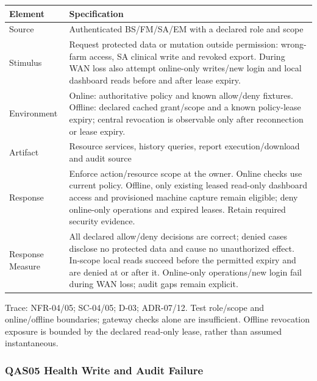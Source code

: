 {\small
\begin{longtable}[]{|>{\raggedright\arraybackslash}p{}|>{\raggedright\arraybackslash}p{}|}
\hline
\textbf{Element} & \textbf{Specification} \\ \hline
\endhead
Source & Authenticated BS/FM/SA/EM with a declared role and scope \\ \hline
Stimulus & Request protected data or mutation outside permission:
wrong-farm access, SA clinical write and revoked export. During WAN loss
also attempt online-only writes/new login and local dashboard reads
before and after lease expiry. \\ \hline
Environment & Online: authoritative policy and known allow/deny
fixtures. Offline: declared cached grant/scope and a known policy-lease
expiry; central revocation is observable only after reconnection or
lease expiry. \\ \hline
Artifact & Resource services, history queries, report execution/download
and audit source \\ \hline
Response & Enforce action/resource scope at the owner. Online checks use
current policy. Offline, only existing leased read-only dashboard access
and provisioned machine capture remain eligible; deny online-only
operations and expired leases. Retain required security evidence. \\ \hline
Response Measure & All declared allow/deny decisions are correct; denied
cases disclose no protected data and cause no unauthorized effect.
In-scope local reads succeed before the permitted expiry and are denied
at or after it. Online-only operations/new login fail during WAN loss;
audit gaps remain explicit. \\ \hline
\end{longtable}
}

Trace: NFR-04/05; SC-04/05; D-03; ADR-07/12. Test role/scope and
online/offline boundaries; gateway checks alone are insufficient.
Offline revocation exposure is bounded by the declared read-only lease,
rather than assumed instantaneous.

\subsubsection{QAS05 Health Write and Audit Failure}\label{sec:3.4.5}

